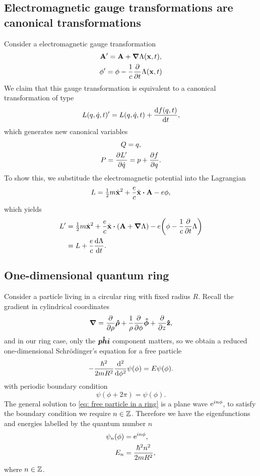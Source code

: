 \documentclass[10pt]{article}
\begin{document}
	\subsection{Electromagnetic gauge transformations are canonical transformations}

	Consider a electromagnetic gauge transformation
	\begin{gather}
		{\bf A}' = {\bf A} + \grad \Lambda({\bf x}, t), \\
		\phi' = \phi - \frac{1}{c} \pdv{t} \Lambda({\bf x}, t)
	\end{gather}
	We claim that this gauge transformation is equivalent to a canonical transformation of type
	\begin{equation}
		L(q, \dot{q}, t)' = L(q, \dot{q}, t) + \dv{f(q,t)}{t},
	\end{equation}
	which generates new canonical variables
	\begin{gather}
		Q = q, \\
		P = \pdv{L'}{\dot{q}} = p + \pdv{f}{q}.
	\end{gather}
	To show this, we substitude the electromagnetic potential into the Lagrangian
	\begin{equation}
		L = \thalf m \dot{\bfx}^2 + \frac{e}{c} \dot{\bfx} \vdot \bfA - e \phi,
	\end{equation}
	which yields
	\begin{align*}
		L' &= \thalf m \dot{\bfx}^2 + \frac{e}{c} \dot{\bfx} \vdot (\bfA + \grad \Lambda) - e \qty(\phi - \frac{1}{c} \pdv{t} \Lambda) \\
		&= L + \frac{e}{c} \dv{\Lambda}{t}.
	\end{align*}

	\subsection{One-dimensional quantum ring}
	Consider a particle living in a circular ring with fixed radius $R$. Recall the gradient in cylindrical coordinates
	\begin{equation}
		\grad = \pdv{\rho} \vu*{\rho} + \frac{1}{\rho}\pdv{\phi} \vu*{\phi} + \pdv{z} \vu{z},
	\end{equation}
	and in our ring case, only the $\vu*{phi}$ component matters, so we obtain a reduced one-dimensional Schr\"{o}dinger's equation for a free particle
	\begin{equation}
		- \frac{\hbar^2}{2mR^2} \dv[2]{\phi} \psi(\phi) = E \psi(\phi). \label{eq: free particle in a ring}
	\end{equation}
	with periodic boundary condition
	\begin{equation}
		\psi(\phi + 2 \pi) = \psi(\phi).
	\end{equation}
	The general solution to \eqref{eq: free particle in a ring} is a plane wave ${\mathrm{e}}^{i n \phi}$, to satisfy the boundary condition we require $n \in {\mathbb{Z}}$. Therefore we have the eigenfunctions and energies labelled by the quantum number $n$
	\begin{align}
		\psi_n(\phi) &= {\mathrm{e}}^{i n \phi}, \\
		E_n &= \frac{\hbar^2 n^2}{2mR^2},
	\end{align}
	where $n \in {\mathbb{Z}}$.
\end{document}
